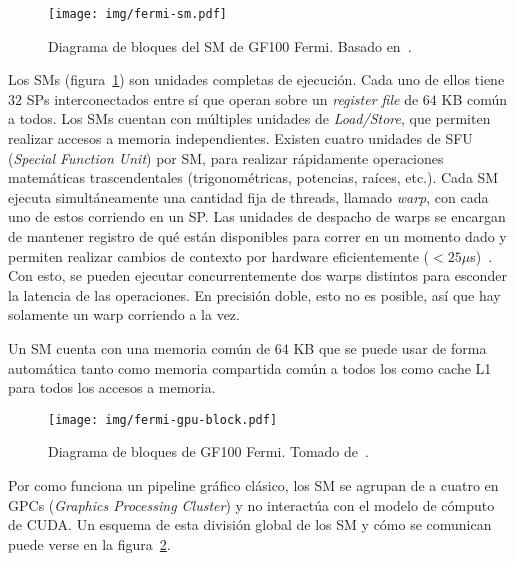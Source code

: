 \begin{figure}[htbp]
    \centering
    \texttt{[image: img/fermi-sm.pdf]}
    \caption{Diagrama de bloques del SM de GF100 Fermi. Basado en~\cite{NvidiaFermi}.}
    \label{fermi_sm}
\end{figure}

Los SMs (figura~\ref{fermi_sm}) son unidades completas de ejecuci\'on.
Cada uno de ellos tiene $32$ SPs interconectados entre s\'i que operan sobre un \emph{register file} de $64$ KB com\'un a todos.
Los SMs cuentan con m\'ultiples unidades de \emph{Load/Store}, que permiten realizar accesos a memoria independientes.
Existen cuatro unidades de SFU (\textit{Special Function Unit}) por SM, para realizar r\'apidamente operaciones matem\'aticas trascendentales (trigonom\'etricas, potencias, ra\'ices, etc.).
Cada SM ejecuta simult\'aneamente una cantidad fija de threads, llamado \textit{warp}, con cada uno de estos corriendo en un SP.
Las unidades de despacho de warps se encargan de mantener registro de qu\'e \threads{} est\'an disponibles para correr en un momento dado y permiten realizar cambios de contexto por hardware
eficientemente ($<25 \mu$s)~\cite{PattersonFermi}.
Con esto, se pueden ejecutar concurrentemente dos warps distintos para esconder la latencia de las operaciones.
En precisi\'on doble, esto no es posible, as\'i que hay solamente un warp corriendo a la vez.

Un SM cuenta con una memoria com\'un de $64$ KB que se puede usar de forma autom\'atica tanto como memoria compartida com\'un a todos los \threads{} como cache L1 para todos los accesos a memoria.

\begin{figure}[htbp]
    \centering
    \texttt{[image: img/fermi-gpu-block.pdf]}
    \caption{Diagrama de bloques de GF100 Fermi. Tomado de~\cite{NvidiaFermi}.}
    \label{fermi_gpu_block}
\end{figure}

Por como funciona un pipeline gr\'afico cl\'asico, los SM se agrupan de a cuatro en GPCs (\textit{Graphics Processing Cluster}) y no interact\'ua con el modelo de c\'omputo
de CUDA.
Un esquema de esta divisi\'on global de los SM y c\'omo se comunican puede verse en la figura~\ref{fermi_gpu_block}.


